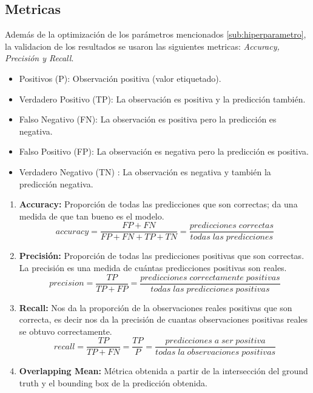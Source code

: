 \subsection{Metricas}\label{sub:metricas}

Además de la optimización de los parámetros mencionados \ref{sub:hiperparametro}, la validacion de los resultados se usaron las siguientes metricas: \textit{Accuracy, Precisión y Recall}.

\begin{itemize}
	\item Positivos (P): Observación positiva (valor etiquetado).
	\item Verdadero Positivo (TP): La observación es positiva y la predicción también.
	\item Falso Negativo (FN): La observación es positiva pero la predicción es negativa.
	\item Falso Positivo (FP): La observación es negativa pero la predicción es positiva.
	\item Verdadero Negativo (TN) :  La observación es negativa y también la predicción negativa.
\end{itemize}

\begin{enumerate}
\item \textbf{Accuracy:} Proporción de todas las predicciones que son correctas; da una medida de que tan bueno es el modelo.
\begin{equation}
accuracy = \frac{FP+FN}{FP+FN+TP+TN}=\frac{predicciones\;correctas}{todas\;las\;predicciones}
\end{equation}

\item \textbf{Precisión:} Proporción de todas las predicciones positivas que son correctas. La precisión es una medida de cuántas predicciones positivas son reales.
\begin{equation}
precision=\frac{TP}{TP+FP}= \frac{predicciones\;correctamente\;positivas}{todas\;las\;predicciones\;positivas}
\end{equation}

\item \textbf{Recall:} Nos da la proporción de la observaciones reales positivas que son correcta, es decir nos da la precisión de cuantas observaciones positivas reales se obtuvo correctamente.
\begin{equation}
recall = \frac{TP}{TP+FN} = \frac{TP}{P} = \frac{predicciones\;a\;ser\;positiva}{todas\;la\;observaciones\;positivas} 
\end{equation}

\item \textbf{Overlapping Mean:} Métrica obtenida a partir de la intersección del ground truth y el bounding box de la predicción obtenida.

\end{enumerate}


